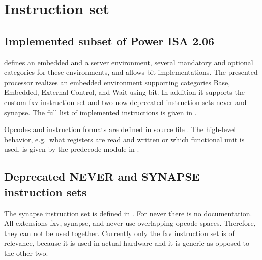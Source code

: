 \chapter{Instruction set}

\minitoc

\section{Implemented subset of Power ISA 2.06}

\cite{powerisa_206} defines an embedded and a server environment, several mandatory and optional categories for these environments, and allows \unit[32 and 64]{bit} implementations.
The presented processor realizes an embedded environment supporting categories Base, Embedded, External Control, and Wait using \unit[32]{bit}.
In addition it supports the custom \gls{fxv} instruction set and two now deprecated instruction sets \gls{never} and \gls{synapse}.
The full list of implemented instructions is given in \cite{friedmann13phd}.

Opcodes and instruction formats are defined in source file .
The high-level behavior, e.g.\ what registers are read and written or which functional unit is used, is given by the predecode module in .





\section{Deprecated NEVER and SYNAPSE instruction sets}

The \gls{synapse} instruction set is defined in \cite{friedmann13phd}.
For \gls{never} there is no documentation.
All extensions \gls{fxv}, \gls{synapse}, and \gls{never} use overlapping opcode spaces.
Therefore, they can not be used together.
Currently only the \gls{fxv} instruction set is of relevance, because it is used in actual hardware \citep{dlspaper15} and it is generic as opposed to the other two.
